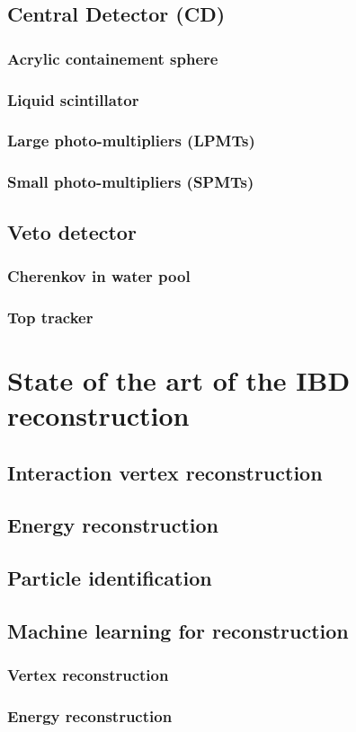 \subsection{Central Detector (CD)}

\subsubsection{Acrylic containement sphere}

\subsubsection{Liquid scintillator}

\subsubsection{Large photo-multipliers (LPMTs)}

\subsubsection{Small photo-multipliers (SPMTs)}

\subsection{Veto detector}

\subsubsection{Cherenkov in water pool}

\subsubsection{Top tracker}

\section{State of the art of the IBD reconstruction}

\subsection{Interaction vertex reconstruction}

\subsection{Energy reconstruction}

\subsection{Particle identification}

\subsection{Machine learning for reconstruction}

\subsubsection{Vertex reconstruction}

\subsubsection{Energy reconstruction}
